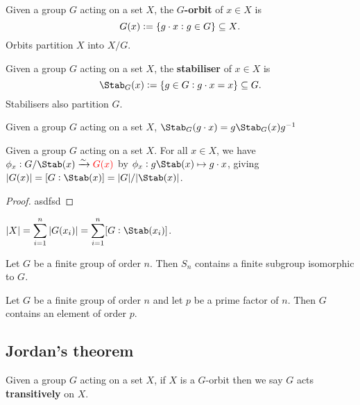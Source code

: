 \documentclass[../Year2.tex]{subfiles}
\begin{document}
\begin{definition}[Orbit]
    Given a group $G$ acting on a set $X$, the \textbf{$G$-orbit} of $x\in X$ is \[
        G(x):=\{g\cdot x:g\in G\} \subseteq X
    \text{\textcolor{black}{.}}
    \] Orbits partition $X$ into $X/G$.
\end{definition}

\begin{definition}[Stabiliser]
    Given a group $G$ acting on a set $X$, the \textbf{stabiliser} of $x\in X$ is \[
        \Stab_G(x):= \{g\in G: g\cdot x = x\} \subseteq G
        \black{.}
    \] Stabilisers also partition $G$.
\end{definition}

\begin{lemma}
    Given a group $G$ acting on a set $X$, $\Stab_G(g\cdot x)=g\Stab_G(x)g^{-1}$
\end{lemma}

\begin{theorem}
    Given a group $G$ acting on a set $X$. For all $x\in X$, we have $\phi_x:G/\Stab(x)\xrightarrow{\sim}\textcolor{red}{G(x)}$ by $\phi_x:g\Stab(x)\mapsto g\cdot x$, giving $|G(x)| = [G:\Stab(x)] = |G|/|\Stab(x)|$.
    \begin{proof}
        asdfsd
    \end{proof}
\end{theorem}

\vspace{-15pt}

\begin{corollary}
    $\displaystyle|X| = \sum_{i=1}^n|G(x_i)| = \sum_{i=1}^n[G:\Stab(x_i)]$. 
\end{corollary}

\begin{corollary}
    Let $G$ be a finite group of order $n$. Then $S_n$ contains a finite subgroup isomorphic to $G$.
\end{corollary}

\begin{corollary}
    Let $G$ be a finite group of order $n$ and let $p$ be a prime factor of $n$. Then $G$ contains an element of order $p$.
\end{corollary}

\subsection{Jordan's theorem}

\begin{definition}
    Given a group $G$ acting on a set $X$, if $X$ is a $G$-orbit then we say $G$ acts \textbf{transitively} on $X$.
\end{definition}
\end{document}
